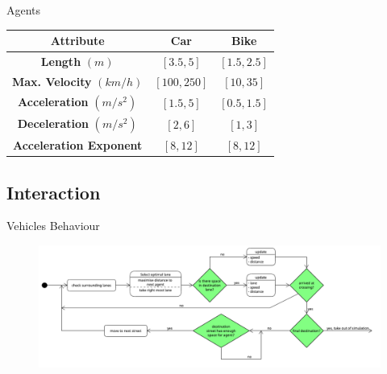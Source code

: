 \begin{frame}{Agents}
        \begin{table}[H]
\hspace{-4.5cm}
\begin{tabularx}{0.85\linewidth}{C|C|C}
    \textbf{Attribute} & \textbf{Car} & \textbf{Bike}\\
    \hline
    \textbf{Length} $(m)$ & $[3.5, 5]$ & $[1.5, 2.5]$\\
    \hline
    \textbf{ Max. Velocity} $(km/h)$ & $[100, 250]$ & $[10, 35]$\\
    \hline 
    \textbf {Acceleration} $(m/s^2)$ & $[1.5, 5]$ & $[0.5, 1.5]$\\
    \hline
    \textbf{Deceleration} $(m/s^2)$ & $[2,6]$ & $[1,3]$ \\
    \hline
    \textbf{Acceleration Exponent} & $[8, 12]$ & $[8,12]$
\end{tabularx}
\end{table}

\end{frame}


\subsection{Interaction}
\begin{frame}{Vehicles Behaviour}
        \begin{figure}
		\includegraphics[width=1\textwidth]{Images/AgentBehaviour.png}
	\end{figure}
\end{frame}

